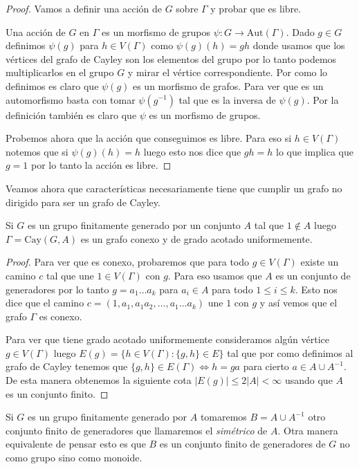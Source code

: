 \documentclass[tesis.tex]{subfiles}
\begin{document}
\begin{proof}
	Vamos a definir una acción de $G$ sobre $\Gamma$ y probar que es libre.
	
	Una acción de $G$ en $\Gamma$ es un morfismo de grupos $\psi: G \to \text{Aut}(\Gamma)$.
	Dado $g \in G$ definimos $\psi(g)$ para $h \in V(\Gamma)$ como $\psi(g)(h) = gh$ donde usamos que los vértices del grafo de Cayley son los elementos del grupo por lo tanto podemos multiplicarlos en el grupo $G$ y mirar el vértice correspondiente.
	Por como lo definimos es claro que $\psi(g)$ es un morfismo de grafos. 
	Para ver que es un automorfismo basta con tomar $\psi(g^{-1})$ tal que es la inversa de $\psi(g)$.
	Por la definición también es claro que $\psi$ es un morfismo de grupos.
	
	Probemos ahora que la acción que conseguimos es libre.
	Para eso si $h \in V(\Gamma)$ notemos que si $\psi(g)(h) = h$ luego esto nos dice que $gh = h$ lo que implica que $g = 1$ por lo tanto la acción es libre.
	
\end{proof}

Veamos ahora que características necesariamente tiene que cumplir un grafo no dirigido para ser un grafo de Cayley.

\begin{lema}\label{lema_cayley_conexo_grado}
	Si $G$ es un grupo finitamente generado por un conjunto $A$ tal que $1 \notin A$ luego $\Gamma = \text{Cay}(G,A)$ es un grafo conexo y de grado acotado uniformemente.
\end{lema}
\begin{proof}
	Para ver que es conexo,	probaremos que para todo $g \in V(\Gamma)$ existe un camino $c$ tal que une $1 \in V(\Gamma)$ con $g$.
	Para eso usamos que $A$ es un conjunto de generadores por lo tanto $g = a_{1} \dots a_{k}$ para $a_{i} \in A$ para todo $1 \le i \le k$.
	Esto nos dice que el camino $c = (1, a_{1}, a_{1}a_{2}, \dots, a_{1} \dots a_{k})$ une $1$ con $g$ y así vemos que el grafo $\Gamma$ es conexo. 
	
	Para ver que tiene grado acotado uniformemente consideramos algún vértice $g \in V(\Gamma)$ luego $E(g) = \{  h \in V(\Gamma) : \{g,h\} \in E \}$ tal que por como definimos al grafo de Cayley tenemos que $\{g,h\} \in E(\Gamma) \iff h = ga$ para cierto $a \in A \cup A^{-1}$.
	De esta manera obtenemos la siguiente cota  $|E(g)| \le 2|A| < \infty$ usando que $A$ es un conjunto finito.
\end{proof}

Si $G$ es un grupo finitamente generado por $A$ tomaremos $B = A \cup A^{-1}$ otro conjunto finito de generadores que llamaremos el \emph{simétrico} de $A$.
Otra manera equivalente de pensar esto es que $B$ es un conjunto finito de generadores de $G$ no como grupo sino como monoide.
\end{document}
